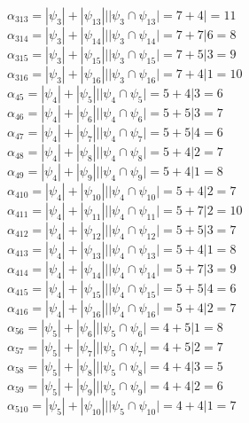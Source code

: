\documentclass[12pt,a4paper]{report}
\begin{document}
$\alpha_{313} = |\psi_{3}| + |\psi_{13}| | |\psi_{3} \cap \psi_{13}| = 7 + 4 |   = 11$ \\
$\alpha_{314} = |\psi_{3}| + |\psi_{14}| | |\psi_{3} \cap \psi_{14}| = 7 + 7 | 6 = 8$ \\
$\alpha_{315} = |\psi_{3}| + |\psi_{15}| | |\psi_{3} \cap \psi_{15}| = 7 + 5 | 3 = 9$ \\
$\alpha_{316} = |\psi_{3}| + |\psi_{16}| | |\psi_{3} \cap \psi_{16}| = 7 + 4 | 1 = 10$ \\
$\alpha_{45} = |\psi_{4}| + |\psi_{5}| | |\psi_{4} \cap \psi_{5}| = 5 + 4 | 3 = 6$ \\
$\alpha_{46} = |\psi_{4}| + |\psi_{6}| | |\psi_{4} \cap \psi_{6}| = 5 + 5 | 3 = 7$ \\
$\alpha_{47} = |\psi_{4}| + |\psi_{7}| | |\psi_{4} \cap \psi_{7}| = 5 + 5 | 4 = 6$ \\
$\alpha_{48} = |\psi_{4}| + |\psi_{8}| | |\psi_{4} \cap \psi_{8}| = 5 + 4 | 2 = 7$ \\
$\alpha_{49} = |\psi_{4}| + |\psi_{9}| | |\psi_{4} \cap \psi_{9}| = 5 + 4 | 1 = 8$ \\
$\alpha_{410} = |\psi_{4}| + |\psi_{10}| | |\psi_{4} \cap \psi_{10}| = 5 + 4 | 2 = 7$ \\
$\alpha_{411} = |\psi_{4}| + |\psi_{11}| | |\psi_{4} \cap \psi_{11}| = 5 + 7 | 2 = 10$ \\
$\alpha_{412} = |\psi_{4}| + |\psi_{12}| | |\psi_{4} \cap \psi_{12}| = 5 + 5 | 3 = 7$ \\
$\alpha_{413} = |\psi_{4}| + |\psi_{13}| | |\psi_{4} \cap \psi_{13}| = 5 + 4 | 1 = 8$ \\
$\alpha_{414} = |\psi_{4}| + |\psi_{14}| | |\psi_{4} \cap \psi_{14}| = 5 + 7 | 3 = 9$ \\
$\alpha_{415} = |\psi_{4}| + |\psi_{15}| | |\psi_{4} \cap \psi_{15}| = 5 + 5 | 4 = 6$ \\
$\alpha_{416} = |\psi_{4}| + |\psi_{16}| | |\psi_{4} \cap \psi_{16}| = 5 + 4 | 2 = 7$ \\
$\alpha_{56} = |\psi_{5}| + |\psi_{6}| | |\psi_{5} \cap \psi_{6}| = 4 + 5 | 1 = 8$ \\
$\alpha_{57} = |\psi_{5}| + |\psi_{7}| | |\psi_{5} \cap \psi_{7}| = 4 + 5 | 2 = 7$ \\
$\alpha_{58} = |\psi_{5}| + |\psi_{8}| | |\psi_{5} \cap \psi_{8}| = 4 + 4 | 3 = 5$ \\
$\alpha_{59} = |\psi_{5}| + |\psi_{9}| | |\psi_{5} \cap \psi_{9}| = 4 + 4 | 2 = 6$ \\
$\alpha_{510} = |\psi_{5}| + |\psi_{10}| | |\psi_{5} \cap \psi_{10}| = 4 + 4 | 1 = 7$ \\
\end{document}
